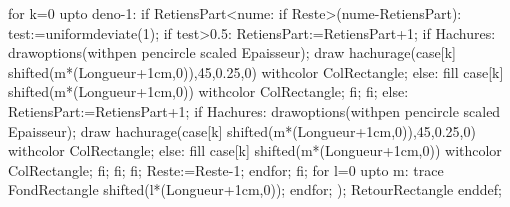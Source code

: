 {        for k=0 upto deno-1:
          if RetiensPart<nume:
            if Reste>(nume-RetiensPart):
              test:=uniformdeviate(1);
              if test>0.5:
                RetiensPart:=RetiensPart+1;
                if Hachures:
                  drawoptions(withpen pencircle scaled Epaisseur);
                  draw hachurage(case[k] shifted(m*(Longueur+1cm,0)),45,0.25,0) withcolor ColRectangle;
                else:
                  fill case[k] shifted(m*(Longueur+1cm,0)) withcolor ColRectangle;
                fi;
              fi;
            else:
              RetiensPart:=RetiensPart+1;
              if Hachures:
                drawoptions(withpen pencircle scaled Epaisseur);
                draw hachurage(case[k] shifted(m*(Longueur+1cm,0)),45,0.25,0) withcolor ColRectangle;
              else:
                fill case[k] shifted(m*(Longueur+1cm,0)) withcolor ColRectangle;
              fi;
            fi;
          fi;
          Reste:=Reste-1;  
        endfor;
      fi;
      for l=0 upto m:
        trace FondRectangle shifted(l*(Longueur+1cm,0));
      endfor;
    );
    RetourRectangle
  enddef;
}%

